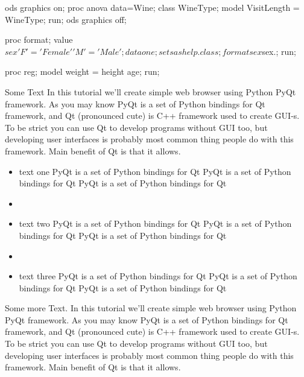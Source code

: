 \documentclass{article}
\begin{document}
\begin{Sascode}[store=wineA]
ods graphics on;
proc anova data=Wine;
   class WineType;
   model VisitLength = WineType;
run;
ods graphics off;
\end{Sascode}




\begin{Datastep}
proc format;
   value $sex 'F' = 'Female' 'M' = 'Male';
data one;
   set sashelp.class;
   format sex $sex.;
run;
\end{Datastep}

\begin{Sascode}[store=class]
proc reg;
    model weight = height age;
run;
\end{Sascode}






Some Text
In this tutorial we'll create simple web browser using Python PyQt
framework. As you may know PyQt is a set of Python bindings for Qt
framework, and Qt (pronounced cute) is C++ framework used to create
GUI-s. To be strict you can use Qt to develop programs without GUI
too, but developing user interfaces is probably most common thing
people do with this framework. Main benefit of Qt is that it allows.

\begin{itemize}
  \item text one PyQt is a set of Python bindings for Qt
  PyQt is a set of Python bindings for Qt
  PyQt is a set of Python bindings for Qt
  \item
  \item text two PyQt is a set of Python bindings for Qt
  PyQt is a set of Python bindings for Qt
  PyQt is a set of Python bindings for Qt
  \item
  \item text three PyQt is a set of Python bindings for Qt
  PyQt is a set of Python bindings for Qt
  PyQt is a set of Python bindings for Qt
\end{itemize}

Some more Text.
In this tutorial we'll create simple web browser using Python PyQt
framework. As you may know PyQt is a set of Python bindings for Qt
framework, and Qt (pronounced cute) is C++ framework used to create
GUI-s. To be strict you can use Qt to develop programs without GUI
too, but developing user interfaces is probably most common thing
people do with this framework. Main benefit of Qt is that it allows.
\end{document}
